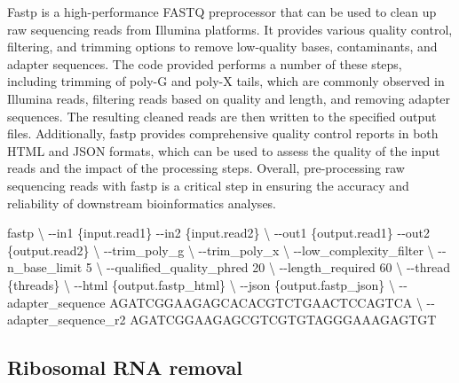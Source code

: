 \documentclass[
]{book}
\newenvironment{Shaded}{\begin{snugshade}}{\end{snugshade}}
\newcommand{\AttributeTok}[1]{\textcolor[rgb]{0.77,0.63,0.00}{#1}}
\newcommand{\DataTypeTok}[1]{\textcolor[rgb]{0.13,0.29,0.53}{#1}}
\newcommand{\ExtensionTok}[1]{#1}
\newcommand{\NormalTok}[1]{#1}
\begin{document}
Fastp is a high-performance FASTQ preprocessor that can be used to clean up raw sequencing reads from Illumina platforms. It provides various quality control, filtering, and trimming options to remove low-quality bases, contaminants, and adapter sequences. The code provided performs a number of these steps, including trimming of poly-G and poly-X tails, which are commonly observed in Illumina reads, filtering reads based on quality and length, and removing adapter sequences. The resulting cleaned reads are then written to the specified output files. Additionally, fastp provides comprehensive quality control reports in both HTML and JSON formats, which can be used to assess the quality of the input reads and the impact of the processing steps. Overall, pre-processing raw sequencing reads with fastp is a critical step in ensuring the accuracy and reliability of downstream bioinformatics analyses.

\begin{Shaded}
\begin{Highlighting}[]
\ExtensionTok{fastp} \DataTypeTok{\textbackslash{}}
      \AttributeTok{{-}{-}in1}\NormalTok{ \{input.read1\} }\AttributeTok{{-}{-}in2}\NormalTok{ \{input.read2\} }\DataTypeTok{\textbackslash{}}
      \AttributeTok{{-}{-}out1}\NormalTok{ \{output.read1\} }\AttributeTok{{-}{-}out2}\NormalTok{ \{output.read2\} }\DataTypeTok{\textbackslash{}}
      \AttributeTok{{-}{-}trim\_poly\_g} \DataTypeTok{\textbackslash{}}
      \AttributeTok{{-}{-}trim\_poly\_x} \DataTypeTok{\textbackslash{}}
      \AttributeTok{{-}{-}low\_complexity\_filter} \DataTypeTok{\textbackslash{}}
      \AttributeTok{{-}{-}n\_base\_limit}\NormalTok{ 5 }\DataTypeTok{\textbackslash{}}
      \AttributeTok{{-}{-}qualified\_quality\_phred}\NormalTok{ 20 }\DataTypeTok{\textbackslash{}}
      \AttributeTok{{-}{-}length\_required}\NormalTok{ 60 }\DataTypeTok{\textbackslash{}}
      \AttributeTok{{-}{-}thread}\NormalTok{ \{threads\} }\DataTypeTok{\textbackslash{}}
      \AttributeTok{{-}{-}html}\NormalTok{ \{output.fastp\_html\} }\DataTypeTok{\textbackslash{}}
      \AttributeTok{{-}{-}json}\NormalTok{ \{output.fastp\_json\} }\DataTypeTok{\textbackslash{}}
      \AttributeTok{{-}{-}adapter\_sequence}\NormalTok{ AGATCGGAAGAGCACACGTCTGAACTCCAGTCA }\DataTypeTok{\textbackslash{}}
      \AttributeTok{{-}{-}adapter\_sequence\_r2}\NormalTok{  AGATCGGAAGAGCGTCGTGTAGGGAAAGAGTGT}
\end{Highlighting}
\end{Shaded}

\hypertarget{ribosomal-rna-removal}{%
\subsection*{Ribosomal RNA removal}\label{ribosomal-rna-removal}}
\end{document}
